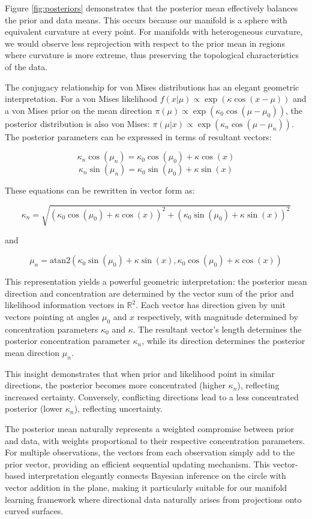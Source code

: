 \documentclass[twoside,11pt]{article}
\begin{document}
Figure \ref{fig:posteriors} demonstrates that the posterior mean effectively balances the prior and data means. This occurs because our manifold is a sphere with equivalent curvature at every point. For manifolds with heterogeneous curvature, we would observe less reprojection with respect to the prior mean in regions where curvature is more extreme, thus preserving the topological characteristics of the data.

The conjugacy relationship for von Mises distributions has an elegant geometric interpretation. For a von Mises likelihood $f(x|\mu) \propto \exp(\kappa \cos(x-\mu))$ and a von Mises prior on the mean direction $\pi(\mu) \propto \exp(\kappa_0 \cos(\mu-\mu_0))$, the posterior distribution is also von Mises: $\pi(\mu|x) \propto \exp(\kappa_n \cos(\mu-\mu_n))$. The posterior parameters can be expressed in terms of resultant vectors:

$$\kappa_n\cos(\mu_n) = \kappa_0\cos(\mu_0) + \kappa\cos(x)$$
$$\kappa_n\sin(\mu_n) = \kappa_0\sin(\mu_0) + \kappa\sin(x)$$

These equations can be rewritten in vector form as:

$$\kappa_n = \sqrt{(\kappa_0\cos(\mu_0) + \kappa\cos(x))^2 + (\kappa_0\sin(\mu_0) + \kappa\sin(x))^2}$$

and 

$$\mu_n = \text{atan2}(\kappa_0\sin(\mu_0) + \kappa\sin(x), \kappa_0\cos(\mu_0) + \kappa\cos(x))$$

This representation yields a powerful geometric interpretation: the posterior mean direction and concentration are determined by the vector sum of the prior and likelihood information vectors in $\mathbb{R}^2$. Each vector has direction given by unit vectors pointing at angles $\mu_0$ and $x$ respectively, with magnitude determined by concentration parameters $\kappa_0$ and $\kappa$. The resultant vector's length determines the posterior concentration parameter $\kappa_n$, while its direction determines the posterior mean direction $\mu_n$. 

This insight demonstrates that when prior and likelihood point in similar directions, the posterior becomes more concentrated (higher $\kappa_n$), reflecting increased certainty. Conversely, conflicting directions lead to a less concentrated posterior (lower $\kappa_n$), reflecting uncertainty.

The posterior mean naturally represents a weighted compromise between prior and data, with weights proportional to their respective concentration parameters. For multiple observations, the vectors from each observation simply add to the prior vector, providing an efficient sequential updating mechanism. This vector-based interpretation elegantly connects Bayesian inference on the circle with vector addition in the plane, making it particularly suitable for our manifold learning framework where directional data naturally arises from projections onto curved surfaces.
\end{document}
